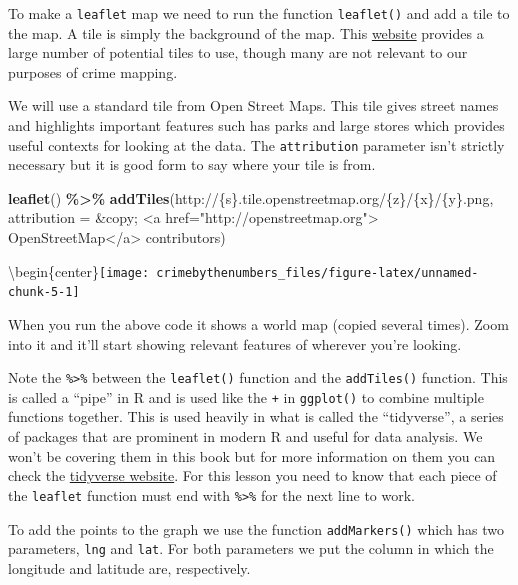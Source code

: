 \documentclass[
  12pt,
]{book}
\newenvironment{Shaded}{\begin{snugshade}}{\end{snugshade}}
\newcommand{\DataTypeTok}[1]{\textcolor[rgb]{0.27,0.27,0.27}{#1}}
\newcommand{\KeywordTok}[1]{\textcolor[rgb]{0.27,0.27,0.27}{\textbf{#1}}}
\newcommand{\NormalTok}[1]{#1}
\newcommand{\OperatorTok}[1]{\textcolor[rgb]{0.43,0.43,0.43}{\textbf{#1}}}
\newcommand{\StringTok}[1]{\textcolor[rgb]{0.5,0.5,0.5}{#1}}
\begin{document}
To make a \texttt{leaflet} map we need to run the function \texttt{leaflet()} and add a tile to the map. A tile is simply the background of the map. This \href{https://leaflet-extras.github.io/leaflet-providers/preview/}{website} provides a large number of potential tiles to use, though many are not relevant to our purposes of crime mapping.

We will use a standard tile from Open Street Maps. This tile gives street names and highlights important features such has parks and large stores which provides useful contexts for looking at the data. The \texttt{attribution} parameter isn't strictly necessary but it is good form to say where your tile is from.

\begin{Shaded}
\begin{Highlighting}[]
\KeywordTok{leaflet}\NormalTok{() }\OperatorTok{\%\textgreater{}\%}\StringTok{ }
\StringTok{  }\KeywordTok{addTiles}\NormalTok{(}\StringTok{\textquotesingle{}http://\{s\}.tile.openstreetmap.org/\{z\}/\{x\}/\{y\}.png\textquotesingle{}}\NormalTok{, }
           \DataTypeTok{attribution =} \StringTok{\textquotesingle{}\&copy; \textless{}a href="http://openstreetmap.org"\textgreater{}}
\StringTok{                OpenStreetMap\textless{}/a\textgreater{} contributors\textquotesingle{}}\NormalTok{)}
\end{Highlighting}
\end{Shaded}

\textbackslash begin\{center\}\texttt{[image: crimebythenumbers\_files/figure-latex/unnamed-chunk-5-1]}

When you run the above code it shows a world map (copied several times). Zoom into it and it'll start showing relevant features of wherever you're looking.

Note the \texttt{\%\textgreater{}\%} between the \texttt{leaflet()} function and the \texttt{addTiles()} function. This is called a ``pipe'' in R and is used like the \texttt{+} in \texttt{ggplot()} to combine multiple functions together. This is used heavily in what is called the ``tidyverse'', a series of packages that are prominent in modern R and useful for data analysis. We won't be covering them in this book but for more information on them you can check the \href{https://www.tidyverse.org/}{tidyverse website}. For this lesson you need to know that each piece of the \texttt{leaflet} function must end with \texttt{\%\textgreater{}\%} for the next line to work.

To add the points to the graph we use the function \texttt{addMarkers()} which has two parameters, \texttt{lng} and \texttt{lat}. For both parameters we put the column in which the longitude and latitude are, respectively.
\end{document}
